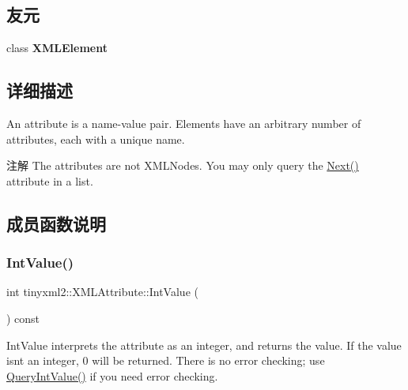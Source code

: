 \subsection*{友元}
\begin{DoxyCompactItemize}
\item 
\mbox{\label{classtinyxml2_1_1_x_m_l_attribute_ac2fba9b6e452829dd892f7392c24e0eb}} 
class {\bfseries X\+M\+L\+Element}
\end{DoxyCompactItemize}


\subsection{详细描述}
An attribute is a name-\/value pair. Elements have an arbitrary number of attributes, each with a unique name.

\begin{DoxyNote}{注解}
The attributes are not X\+M\+L\+Nodes. You may only query the \hyperlink{classtinyxml2_1_1_x_m_l_attribute_aee53571b21e7ce5421eb929523a8bbe6}{Next()} attribute in a list. 
\end{DoxyNote}


\subsection{成员函数说明}
\mbox{\label{classtinyxml2_1_1_x_m_l_attribute_adfa2433f0fdafd5c3880936de9affa80}} 
\subsubsection{\texorpdfstring{Int\+Value()}{IntValue()}}
{\footnotesize\ttfamily int tinyxml2\+::\+X\+M\+L\+Attribute\+::\+Int\+Value (\begin{DoxyParamCaption}{ }\end{DoxyParamCaption}) const\hspace{0.3cm}{\ttfamily [inline]}}

Int\+Value interprets the attribute as an integer, and returns the value. If the value isn\textquotesingle{}t an integer, 0 will be returned. There is no error checking; use \hyperlink{classtinyxml2_1_1_x_m_l_attribute_a6d5176260db00ea301c01af8457cd993}{Query\+Int\+Value()} if you need error checking. \mbox{\label{classtinyxml2_1_1_x_m_l_attribute_a6d5176260db00ea301c01af8457cd993}} 

